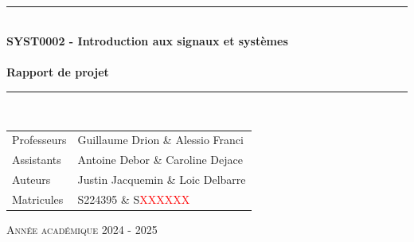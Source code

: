 \documentclass[a4paper, 11pt]{article}
\begin{document}
\begin{titlepage}
\newcommand{\HRule}{\rule{\linewidth}{0.5mm}} 							%
\center
~\\
\vspace{8cm}

\HRule \\[0.5cm]
{ \huge \bfseries  SYST0002 - Introduction aux signaux et systèmes\\ ~\\ \Large Rapport de projet}\\[0.5cm]								
\HRule ~\\[2cm]
\large
\vspace{5cm}


{\Large
\begin{flushleft}
\begin{tabular}{l|l}
    Professeurs & Guillaume Drion \& Alessio Franci\\
    Assistants & Antoine Debor \& Caroline Dejace \\
    Auteurs & {Justin Jacquemin} \& {Loic Delbarre}\\
    Matricules & S{224395} \& S\textcolor{red}{XXXXXX}
\end{tabular}
\end{flushleft}
}


\vfill
\begin{center}
    \textsc{Année académique 2024 - 2025}    
\end{center}

\end{titlepage}
\newpage
\end{document}
